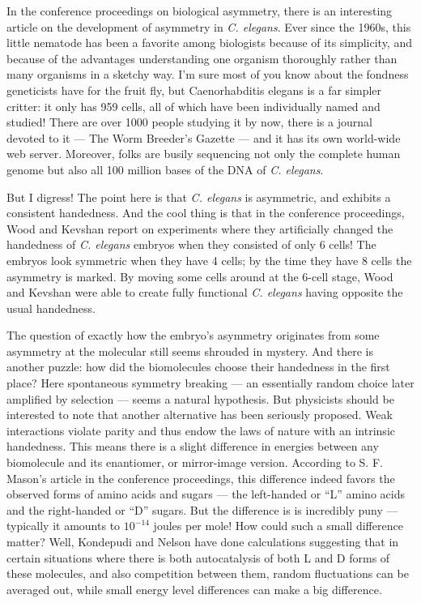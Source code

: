\documentclass{article}
\begin{document}
In the conference proceedings on biological asymmetry, there is an
interesting article on the development of asymmetry in \emph{C.
elegans}. Ever since the 1960s, this little nematode has been a favorite
among biologists because of its simplicity, and because of the
advantages understanding one organism thoroughly rather than many
organisms in a sketchy way. I'm sure most of you know about the fondness
geneticists have for the fruit fly, but Caenorhabditis elegans is a far
simpler critter: it only has 959 cells, all of which have been
individually named and studied! There are over 1000 people studying it
by now, there is a journal devoted to it --- The Worm Breeder's Gazette
--- and it has its own world-wide web server. Moreover, folks are busily
sequencing not only the complete human genome but also all 100 million
bases of the DNA of \emph{C. elegans}.

But I digress! The point here is that \emph{C. elegans} is asymmetric,
and exhibits a consistent handedness. And the cool thing is that in the
conference proceedings, Wood and Kevshan report on experiments where
they artificially changed the handedness of \emph{C. elegans} embryos
when they consisted of only 6 cells! The embryos look symmetric when
they have 4 cells; by the time they have 8 cells the asymmetry is
marked. By moving some cells around at the 6-cell stage, Wood and
Kevshan were able to create fully functional \emph{C. elegans} having
opposite the usual handedness.

The question of exactly how the embryo's asymmetry originates from some
asymmetry at the molecular still seems shrouded in mystery. And there is
another puzzle: how did the biomolecules choose their handedness in the
first place? Here spontaneous symmetry breaking --- an essentially
random choice later amplified by selection --- seems a natural
hypothesis. But physicists should be interested to note that another
alternative has been seriously proposed. Weak interactions violate
parity and thus endow the laws of nature with an intrinsic handedness.
This means there is a slight difference in energies between any
biomolecule and its enantiomer, or mirror-image version. According to S.
F. Mason's article in the conference proceedings, this difference indeed
favors the observed forms of amino acids and sugars --- the left-handed
or ``L'' amino acids and the right-handed or ``D'' sugars. But the
difference is is incredibly puny --- typically it amounts to
\(10^{-14}\) joules per mole! How could such a small difference matter?
Well, Kondepudi and Nelson have done calculations suggesting that in
certain situations where there is both autocatalysis of both L and D
forms of these molecules, and also competition between them, random
fluctuations can be averaged out, while small energy level differences
can make a big difference.
\end{document}
